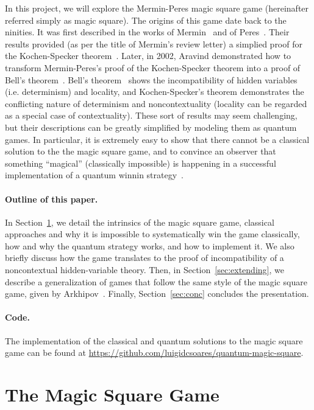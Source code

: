 \documentclass{llncs}
\begin{document}
In this project, we will explore the Mermin-Peres magic square game
(hereinafter referred simply as magic square). The origins of this
game date back to the ninities. It was first described in the works of
Mermin~\cite{mermin:1990, mermin:1993} and of
Peres~\cite{peres:1990, peres:1997}. Their results provided (as per the title of
Mermin's review letter) a simplied proof for the Kochen-Specker
theorem~\cite{kochen:1967}. Later, in 2002, Aravind demonstrated how
to transform Mermin-Peres's proof of the Kochen-Specker theorem into a
proof of Bell's theorem~\cite{aravind:2002}. Bell's
theorem~\cite{bell:1964} shows the incompatibility of hidden variables
(i.e. determinism) and locality, and Kochen-Specker's theorem
demonstrates the conflicting nature of determinism and
noncontextuality (locality can be regarded as a special case of
contextuality). These sort of results may seem
challenging, but their descriptions can be greatly simplified by
modeling them as quantum games.  In particular, it is extremely easy
to show that there cannot be a classical solution to the the magic
square game, and to convince an observer that something ``magical''
(classically impossible) is happening in a successful implementation
of a quantum winnin strategy~\cite{brassard:2005}.

\paragraph{Outline of this paper.}
In Section~\ref{sec:magic-square}, we detail the intrinsics of the
magic square game, classical approaches and why it is impossible to
systematically win the game classically, how and why the quantum
strategy works, and how to implement it. We also briefly discuss how
the game translates to the proof of incompatibility of a
noncontextual hidden-variable theory. Then, in
Section~\ref{sec:extending}, we describe a generalization of games
that follow the same style of the magic square game, given
by Arkhipov~\cite{arkhipov:2012}. Finally, Section~\ref{sec:conc} concludes the
presentation.

\paragraph{Code.} The implementation of the classical and quantum
solutions to the magic square game can be found at
\url{https://github.com/luigidcsoares/quantum-magic-square}.

\section{The Magic Square Game}
\label{sec:magic-square}
\end{document}
